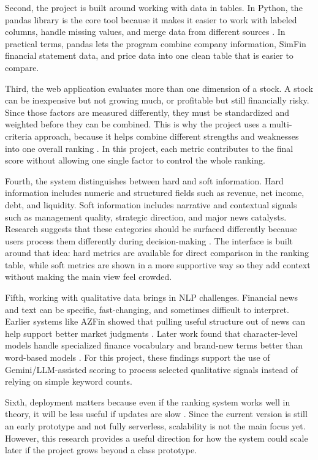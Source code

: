\documentclass[12pt]{article}
\begin{document}
Second, the project is built around working with data in tables. In Python, the pandas library is the core tool because it makes it easier to work with labeled columns, handle missing values, and merge data from different sources \cite{McKinney2010Pandas}. In practical terms, pandas lets the program combine company information, SimFin financial statement data, and price data into one clean table that is easier to compare.

Third, the web application evaluates more than one dimension of a stock. A stock can be inexpensive but not growing much, or profitable but still financially risky. Since those factors are measured differently, they must be standardized and weighted before they can be combined. This is why the project uses a multi-criteria approach, because it helps combine different strengths and weaknesses into one overall ranking \cite{behzadian2012vikor}. In this project, each metric contributes to the final score without allowing one single factor to control the whole ranking.

Fourth, the system distinguishes between hard and soft information. Hard information includes numeric and structured fields such as revenue, net income, debt, and liquidity. Soft information includes narrative and contextual signals such as management quality, strategic direction, and major news catalysts. Research suggests that these categories should be surfaced differently because users process them differently during decision-making \cite{Ettredge2001WebDesign}. The interface is built around that idea: hard metrics are available for direct comparison in the ranking table, while soft metrics are shown in a more supportive way so they add context without making the main view feel crowded.

Fifth, working with qualitative data brings in NLP challenges. Financial news and text can be specific, fast-changing, and sometimes difficult to interpret. Earlier systems like AZFin showed that pulling useful structure out of news can help support better market judgments \cite{Schumaker2009Textual}. Later work found that character-level models handle specialized finance vocabulary and brand-new terms better than word-based models \cite{dos-santos-pinheiro-dras-2017-stock}. For this project, these findings support the use of Gemini/LLM-assisted scoring to process selected qualitative signals instead of relying on simple keyword counts.

Sixth, deployment matters because even if the ranking system works well in theory, it will be less useful if updates are slow \cite{solaimalai2025serverless}. Since the current version is still an early prototype and not fully serverless, scalability is not the main focus yet. However, this research provides a useful direction for how the system could scale later if the project grows beyond a class prototype.
\end{document}
